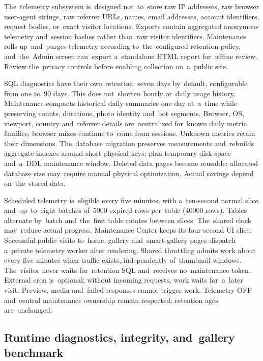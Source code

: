 \documentclass[11pt,a4paper]{article}
\begin{document}
The~telemetry subsystem is~designed not~to~store raw IP addresses, raw browser
user-agent strings, raw referrer URLs, names, email addresses, account
identifiers, request bodies, or~exact visitor locations. Exports contain
aggregated anonymous telemetry and~session hashes rather than~raw visitor
identifiers. Maintenance rolls up~and~purges telemetry according
to~the~configured retention policy, and~the~Admin screen can~export a~standalone
HTML report for~offline review. Review the~privacy controls before enabling
collection on~a~public site.

SQL diagnostics have their own retention: seven days by~default, configurable
from one to~90 days. This does not~shorten hourly or~daily usage history.
Maintenance compacts historical daily summaries one day at~a~time while
preserving
counts, durations, photo identity and~bot segments. Browser, OS, viewport,
country
and~referrer details are~neutralized for~known daily metric families; browser
mixes
continue to~come from sessions. Unknown metrics retain their dimensions.
The~database migration preserves measurements and~rebuilds aggregate indexes
around short physical keys; plan temporary disk space and~a~DDL maintenance
window. Deleted data pages become reusable; allocated database size may~require
manual physical optimization. Actual savings depend on~the~stored data.

Scheduled telemetry is~eligible every five minutes, with a~ten-second normal
slice and~up~to~eight batches of~5000 expired rows per~table (40000 rows).
Tables alternate by~batch and~the~first table rotates between slices. The~shared
clock may~reduce actual progress. Maintenance Center keeps its four-second UI
slice. Successful public visits to~home, gallery and~smart-gallery pages
dispatch
a~private telemetry worker after rendering. Shared throttling admits work about
every five minutes when traffic exists, independently of~thumbnail windows.
The~visitor never waits for~retention SQL and~receives no~maintenance token.
External cron is~optional; without incoming requests, work waits for~a~later
visit.
Preview, media and~failed responses cannot trigger work. Telemetry OFF
and~central
maintenance ownership remain respected; retention ages are~unchanged.

\subsection{Runtime diagnostics, integrity, and~gallery benchmark}
\end{document}
